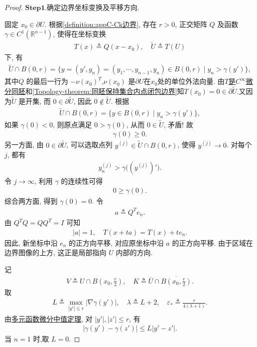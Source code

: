 \documentclass[../../main.tex]{subfiles}
\begin{document}
\begin{proof}
\noindent$\mathbf{Step}\bm{1}$.{\heiti 确定边界坐标变换及平移方向.}

固定 $x_0\in\partial U$. 根据\cref{definition:appC-Ck边界}, 存在 $r>0$, 正交矩阵 $Q$ 及函数 $\gamma\in C^{1}(\mathbb{R}^{n-1})$, 使得在坐标变换
\begin{align*}
T(x)\triangleq Q(x-x_0),\quad
\widetilde{U}\triangleq T(U)
\end{align*}
下, 有
\begin{align*}
\widetilde{U}\cap B(0,r)
=
\{y=(y',y_n)=(y_1,\cdots,y_{n-1},y_n)\in B(0,r)\mid y_n>\gamma(y')\},
\end{align*}
其中$Q$ 的最后一行为 $-\nu(x_0)^{T}$,$\nu(x_0)$ 是$\partial U$在$x_0$处的单位外法向量.
由\hyperref[lemma:正交平移变换为等距双射]{$T$是$C^\infty$微分同胚}和\cref{Topology-theorem:同胚保持集合内点闭包边界}知$T(x_0)=0\in\partial\widetilde{U}$.又因为$\widetilde{U}$ 是开集, 而 $0\in\partial\widetilde{U}$, 因此 $0\notin\widetilde{U}$. 根据
\begin{align*}
\widetilde{U}\cap B(0,r)
=
\{y\in B(0,r)\mid y_n>\gamma(y')\},
\end{align*}
如果 $\gamma(0)<0$, 则原点满足 $0>\gamma(0)$, 从而 $0\in\widetilde{U}$, 矛盾! 故
\begin{align*}
\gamma(0)\geqslant0.
\end{align*}
另一方面, 由 $0\in\partial\widetilde{U}$, 可以选取点列
$y^{(j)}\in\widetilde{U}\cap B(0,r)$, 使得 $y^{(j)}\to0$. 对每个 $j$, 都有
\begin{align*}
y_n^{(j)}>\gamma\bigl((y^{(j)})'\bigr).
\end{align*}
令 $j\to\infty$, 利用 $\gamma$ 的连续性可得
\begin{align*}
0\geqslant\gamma(0).
\end{align*}
综合两方面, 得到 $\gamma(0)=0$. 
令
\begin{align*}
a\triangleq Q^{T}e_n.
\end{align*}
由 $Q^{T}Q=QQ^{T}=I$ 可知
\begin{align*}
|a|=1,\quad
T(x+ta)=T(x)+te_n.
\end{align*}
因此, 新坐标中沿 $e_n$ 的正方向平移, 对应原坐标中沿 $a$ 的正方向平移. 由于区域在边界图像的上方, 这正是局部指向 $U$ 内部的方向.

记
\begin{align*}
V\triangleq U\cap B\left(x_0,\frac{r}{2}\right),\quad
K\triangleq\overline{U}\cap\overline{B\left(x_0,\frac{r}{2}\right)}.
\end{align*}
取
\begin{align*}
L\triangleq\max\limits_{|y'|\leqslant r}|\nabla\gamma(y')|,\quad
\lambda\triangleq L+2,\quad
\varepsilon_{*}\triangleq\frac{r}{4(\lambda+1)}.
\end{align*}
由\hyperref[Basis of Analytics-theorem:多元函数带Peano余项的Taylor公式]{多元函数微分中值定理}, 对 $|y'|,|z'|\leqslant r$, 有
\begin{align}\label{eq::JIOJAMZKZMCBNVZXVV1}
|\gamma(y')-\gamma(z')|\leqslant L|y'-z'|.
\end{align}
当 $n=1$ 时,取 $L=0$.


\end{proof}
\end{document}
